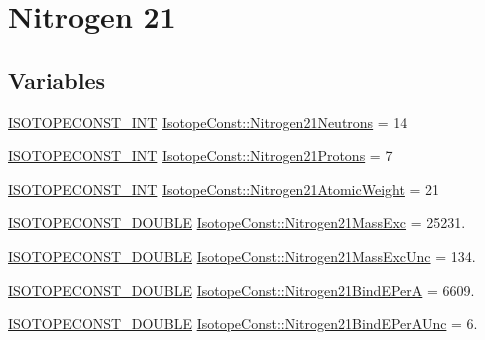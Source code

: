 \hypertarget{group___isotope_const-_nitrogen-_n21}{}\section{Nitrogen 21}
\label{group___isotope_const-_nitrogen-_n21}
\subsection*{Variables}
\begin{DoxyCompactItemize}
\item 
\mbox{\hyperlink{group___isotope_const-_macros_ga5f18360b3e99483a35c32d789e62621c}{I\+S\+O\+T\+O\+P\+E\+C\+O\+N\+S\+T\+\_\+\+I\+NT}} \mbox{\hyperlink{group___isotope_const-_nitrogen-_n21_ga383dd44d2b9820f8741bb43261df66e9}{Isotope\+Const\+::\+Nitrogen21\+Neutrons}} = 14
\item 
\mbox{\hyperlink{group___isotope_const-_macros_ga5f18360b3e99483a35c32d789e62621c}{I\+S\+O\+T\+O\+P\+E\+C\+O\+N\+S\+T\+\_\+\+I\+NT}} \mbox{\hyperlink{group___isotope_const-_nitrogen-_n21_ga17bacc10f6b60b23a609642cc575fd49}{Isotope\+Const\+::\+Nitrogen21\+Protons}} = 7
\item 
\mbox{\hyperlink{group___isotope_const-_macros_ga5f18360b3e99483a35c32d789e62621c}{I\+S\+O\+T\+O\+P\+E\+C\+O\+N\+S\+T\+\_\+\+I\+NT}} \mbox{\hyperlink{group___isotope_const-_nitrogen-_n21_ga7a6d1a516153190810ceba9487b46f05}{Isotope\+Const\+::\+Nitrogen21\+Atomic\+Weight}} = 21
\item 
\mbox{\hyperlink{group___isotope_const-_macros_ga8f45a7272ce02c0b4c65c44636ed719a}{I\+S\+O\+T\+O\+P\+E\+C\+O\+N\+S\+T\+\_\+\+D\+O\+U\+B\+LE}} \mbox{\hyperlink{group___isotope_const-_nitrogen-_n21_ga968aba2d40d545db0c086c12d7693024}{Isotope\+Const\+::\+Nitrogen21\+Mass\+Exc}} = 25231.
\item 
\mbox{\hyperlink{group___isotope_const-_macros_ga8f45a7272ce02c0b4c65c44636ed719a}{I\+S\+O\+T\+O\+P\+E\+C\+O\+N\+S\+T\+\_\+\+D\+O\+U\+B\+LE}} \mbox{\hyperlink{group___isotope_const-_nitrogen-_n21_gab59fef0e052091c3f047b8d85a7a39f1}{Isotope\+Const\+::\+Nitrogen21\+Mass\+Exc\+Unc}} = 134.
\item 
\mbox{\hyperlink{group___isotope_const-_macros_ga8f45a7272ce02c0b4c65c44636ed719a}{I\+S\+O\+T\+O\+P\+E\+C\+O\+N\+S\+T\+\_\+\+D\+O\+U\+B\+LE}} \mbox{\hyperlink{group___isotope_const-_nitrogen-_n21_ga1754bea399648796d0126aa106092db3}{Isotope\+Const\+::\+Nitrogen21\+Bind\+E\+PerA}} = 6609.
\item 
\mbox{\hyperlink{group___isotope_const-_macros_ga8f45a7272ce02c0b4c65c44636ed719a}{I\+S\+O\+T\+O\+P\+E\+C\+O\+N\+S\+T\+\_\+\+D\+O\+U\+B\+LE}} \mbox{\hyperlink{group___isotope_const-_nitrogen-_n21_gafac750aae3ad5642ab74bd12c84be92d}{Isotope\+Const\+::\+Nitrogen21\+Bind\+E\+Per\+A\+Unc}} = 6.

\end{DoxyCompactItemize}
